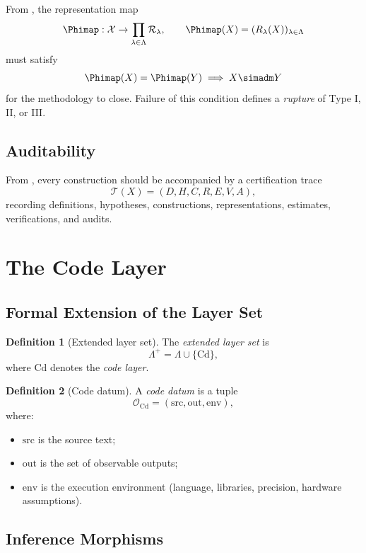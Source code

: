\documentclass[11pt,a4paper]{article}
\theoremstyle{definition}
\newtheorem{definition}{Definition}[section]
\theoremstyle{plain}
\newcommand{\Lam}{\Lambda}
\newcommand{\Cd}{\mathrm{Cd}}
\newcommand{\Xcal}{\mathcal{X}}
\newcommand{\Rcal}{\mathcal{R}}
\newcommand{\Tcal}{\mathcal{T}}
\newcommand{\Ocal}{\mathcal{O}}
\begin{document}
From \cite{paperII}, the representation map
\[
  \Phimap : \Xcal \to \prod_{\lambda \in \Lam} \Rcal_\lambda,
  \qquad
  \Phimap(X) = (R_\lambda(X))_{\lambda \in \Lam}
\]
must satisfy
\[
  \Phimap(X) = \Phimap(Y) \;\Longrightarrow\; X \simadm Y
\]
for the methodology to close. Failure of this condition defines a
\emph{rupture} of Type I, II, or III.

\subsection{Auditability}

From \cite{paperIII}, every construction should be accompanied by
a certification trace
\[
  \Tcal(X) = (D, H, C, R, E, V, A),
\]
recording definitions, hypotheses, constructions, representations,
estimates, verifications, and audits.

\section{The Code Layer}
\label{sec:foundations-code}

\subsection{Formal Extension of the Layer Set}

\begin{definition}[Extended layer set]\label{def:extended-layers}
The \emph{extended layer set} is
\[
  \Lam^+ = \Lam \cup \{\Cd\},
\]
where $\Cd$ denotes the \emph{code layer}.
\end{definition}

\begin{definition}[Code datum]\label{def:code-datum}
A \emph{code datum} is a tuple
\[
  \Ocal_\Cd = (\mathrm{src}, \mathrm{out}, \mathrm{env}),
\]
where:
\begin{itemize}
  \item $\mathrm{src}$ is the source text;
  \item $\mathrm{out}$ is the set of observable outputs;
  \item $\mathrm{env}$ is the execution environment (language,
        libraries, precision, hardware assumptions).
\end{itemize}
\end{definition}

\subsection{Inference Morphisms}
\end{document}
